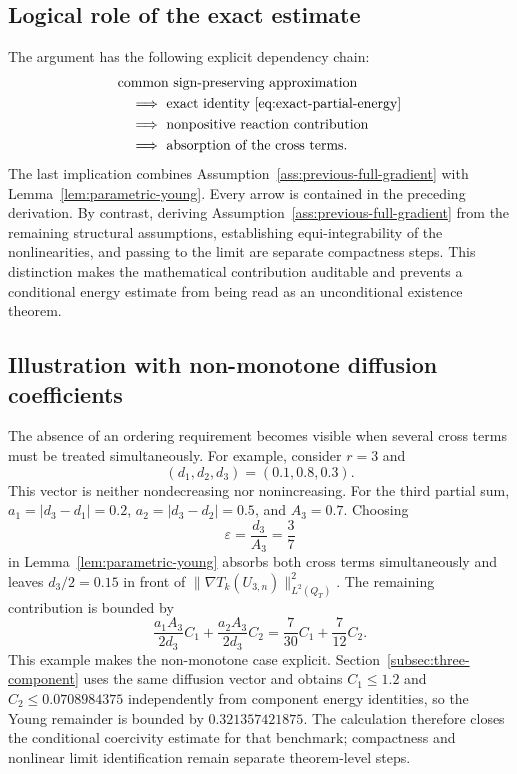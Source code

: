\subsection{Logical role of the exact estimate}

The argument has the following explicit dependency chain:
\begin{equation*}
\begin{aligned}
&\text{common sign-preserving approximation}\\
&\quad\Longrightarrow\text{ exact identity~\eqref{eq:exact-partial-energy}}\\
&\quad\Longrightarrow\text{ nonpositive reaction contribution}\\
&\quad\Longrightarrow\text{ absorption of the cross terms}.
\end{aligned}
\end{equation*}
The last implication combines Assumption~\ref{ass:previous-full-gradient} with Lemma~\ref{lem:parametric-young}. Every arrow is contained in the preceding derivation. By contrast, deriving Assumption~\ref{ass:previous-full-gradient} from the remaining structural assumptions, establishing equi-integrability of the nonlinearities, and passing to the limit are separate compactness steps. This distinction makes the mathematical contribution auditable and prevents a conditional energy estimate from being read as an unconditional existence theorem.

\subsection{Illustration with non-monotone diffusion coefficients}

The absence of an ordering requirement becomes visible when several cross terms must be treated simultaneously. For example, consider $r=3$ and
\[
 (d_1,d_2,d_3)=(0.1,0.8,0.3).
\]
This vector is neither nondecreasing nor nonincreasing. For the third partial sum, $a_1=|d_3-d_1|=0.2$, $a_2=|d_3-d_2|=0.5$, and $A_3=0.7$. Choosing
\[
 \varepsilon=\frac{d_3}{A_3}=\frac{3}{7}
\]
in Lemma~\ref{lem:parametric-young} absorbs both cross terms simultaneously and leaves $d_3/2=0.15$ in front of $\|\nabla T_k(U_{3,n})\|_{L^2(Q_T)}^2$. The remaining contribution is bounded by
\[
 \frac{a_1A_3}{2d_3}C_1+\frac{a_2A_3}{2d_3}C_2
 =\frac{7}{30}C_1+\frac{7}{12}C_2.
\]
This example makes the non-monotone case explicit. Section~\ref{subsec:three-component} uses the same diffusion vector and obtains $C_1\le1.2$ and $C_2\le0.0708984375$ independently from component energy identities, so the Young remainder is bounded by $0.321357421875$. The calculation therefore closes the conditional coercivity estimate for that benchmark; compactness and nonlinear limit identification remain separate theorem-level steps.
